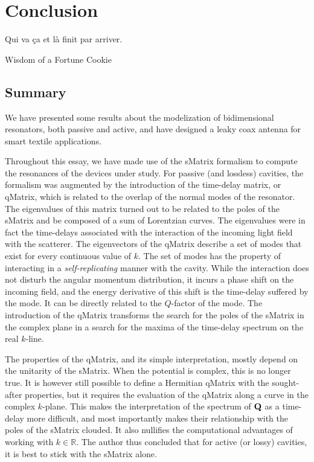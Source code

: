 \chapter{Conclusion}
\epigraph{Qui va ça et là finit par arriver.}{Wisdom of a Fortune Cookie}
\section{Summary}
We have presented some results about the modelization of bidimensional
resonators, both passive and active, and have designed a leaky coax
antenna for smart textile applications. 

Throughout this essay, we have made use of the \gls{sMatrix} formalism
to compute the resonances of the devices under study. For passive
(and lossless) cavities, the formalism was augmented by the
introduction of the time-delay matrix, or \gls{qMatrix}, which
is related to the overlap of the normal modes of the resonator.
The eigenvalues of this matrix turned out to be related to the
poles of the \gls{sMatrix} and be composed of a sum of Lorentzian
curves.  The eigenvalues were in fact the time-delays associated with
the interaction of the incoming light field with the scatterer. 
The eigenvectors of the \gls{qMatrix} describe a set of modes that exist for
every continuous value of $k$. The set of modes has the property of 
interacting in a \textit{self-replicating} manner with the cavity. 
While the interaction does not disturb the angular momentum distribution,
it incurs a phase shift on the incoming field, and the energy derivative
of this shift is the time-delay suffered by the mode. It can be directly
related to the $Q$-factor of the mode. The introduction of the 
\gls{qMatrix} transforms the search for the poles of the \gls{sMatrix}
in the complex plane in a search for the maxima of the time-delay spectrum
on the real $k$-line.

The properties of the \gls{qMatrix}, and its simple interpretation, 
mostly depend on the unitarity of the \gls{sMatrix}. When the 
potential is complex, this is no longer true. It is however still
possible to define a Hermitian \gls{qMatrix} with the sought-after properties,
but it requires the evaluation of the \gls{qMatrix} along a curve in 
the complex $k$-plane. This makes the interpretation of the spectrum
of $\mathbf{Q}$ as a time-delay more difficult, and most importantly 
makes their relationship with the poles of the \gls{sMatrix} clouded.
It also nullifies the computational advantages of working with $k\in\mathbb{R}$.
The author thus concluded that for active (or lossy) cavities, it is best
to stick with the \gls{sMatrix} alone. 

